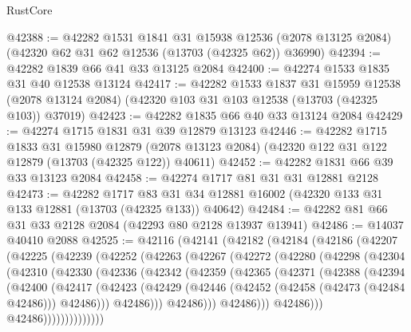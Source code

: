 \begin{lexlean}{RustCore}
\begin{coremodule}
@42388 := @42282
    @1531
    @1841
    @31
    @15938
    @12536
    (@2078 @13125 @2084)
    (@42320 @62 @31 @62 @12536 (@13703 (@42325 @62)) @36990)
@42394 := @42282 @1839 @66 @41 @33 @13125 @2084
@42400 := @42274 @1533 @1835 @31 @40 @12538 @13124
@42417 := @42282
    @1533
    @1837
    @31
    @15959
    @12538
    (@2078 @13124 @2084)
    (@42320 @103 @31 @103 @12538 (@13703 (@42325 @103)) @37019)
@42423 := @42282 @1835 @66 @40 @33 @13124 @2084
@42429 := @42274 @1715 @1831 @31 @39 @12879 @13123
@42446 := @42282
    @1715
    @1833
    @31
    @15980
    @12879
    (@2078 @13123 @2084)
    (@42320 @122 @31 @122 @12879 (@13703 (@42325 @122)) @40611)
@42452 := @42282 @1831 @66 @39 @33 @13123 @2084
@42458 := @42274 @1717 @81 @31 @31 @12881 @2128
@42473 := @42282
    @1717
    @83
    @31
    @34
    @12881
    @16002
    (@42320 @133 @31 @133 @12881 (@13703 (@42325 @133)) @40642)
@42484 := @42282 @81 @66 @31 @33 @2128 @2084 (@42293 @80 @2128 @13937 @13941)
@42486 := @14037 @40410 @2088
@42525 := @42116
    (@42141
      (@42182
        (@42184
          (@42186
            (@42207
              (@42225
                (@42239
                  (@42252
                    (@42263
                      (@42267
                        (@42272
                          (@42280
                            (@42298
                              (@42304
                                (@42310
                                  (@42330
                                    (@42336
                                      (@42342
                                        (@42359
                                          (@42365
                                            (@42371
                                              (@42388
                                                (@42394
                                                  (@42400
                                                    (@42417
                                                      (@42423
                                                        (@42429
                                                          (@42446
                                                            (@42452
                                                              (@42458 (@42473 (@42484 @42486)))
                                                              @42486)))
                                                        @42486)))
                                                  @42486)))
                                            @42486)))
                                      @42486)))
                                @42486))))))))))))))

\end{coremodule}
\end{lexlean}
